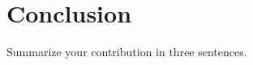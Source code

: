 \documentclass[11pt,a4paper]{article}
\begin{document}
\section{Conclusion}
Summarize your contribution in three sentences.



\end{document}
